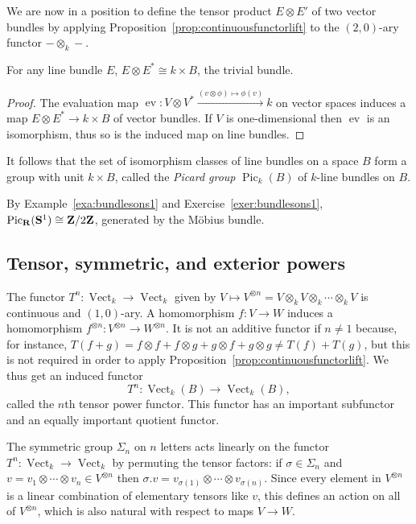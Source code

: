 \documentclass[a4paper,openany]{scrbook}
\DeclareMathOperator{\Vect}{Vect}
\DeclareMathOperator{\Pic}{Pic}
\begin{document}
We are now in a position to define the tensor product $E \otimes E'$ of two vector bundles by applying Proposition~\ref{prop:continuousfunctorlift} to the $(2,0)$-ary functor $- \otimes_k -$.

\begin{lemma}
For any line bundle $E$, $E \otimes E^* \cong k \times B$, the trivial bundle.
\end{lemma}
\begin{proof}
The evaluation map $\operatorname{ev}\colon V \otimes V^* \xrightarrow{(v \otimes \phi) \mapsto \phi(v)} k$ on vector spaces induces a map $E \otimes E^* \to k \times B$ of vector bundles. If $V$ is one-dimensional then $\operatorname{ev}$ is an isomorphism, thus so is the induced map on line bundles.
\end{proof}

It follows that the set of isomorphism classes of line bundles on a space $B$ form a group with unit $k \times B$, called the \emph{Picard group} $\Pic_k(B)$ of $k$-line bundles on $B$.

\begin{example}
By Example~\ref{exa:bundlesons1} and Exercise~\ref{exer:bundlesons1}, $\Pic_{\R}(\S^1) \cong \Z/2\Z$, generated by the Möbius bundle.
\end{example}

\subsection{Tensor, symmetric, and exterior powers}

The functor $T^n\colon \Vect_k \to \Vect_k$ given by $V \mapsto V^{\otimes n} = V \otimes_k V \otimes_k \cdots \otimes_k V$ is continuous and $(1,0)$-ary. A homomorphism $f\colon V \to W$ induces a homomorphism $f^{\otimes n}\colon V^{\otimes n} \to W^{\otimes n}$. It is not an additive functor if $n \neq 1$ because, for instance, $T(f+g) = f \otimes f + f \otimes g + g \otimes f + g \otimes g \neq T(f)+T(g)$, but this is not required in order to apply Proposition~\ref{prop:continuousfunctorlift}. We thus get an induced functor
\[
T^n\colon \Vect_k(B) \to \Vect_k(B),
\]
called the $n$th tensor power functor. This functor has an important subfunctor and an equally important quotient functor.

The symmetric group $\Sigma_n$ on $n$ letters acts linearly on the functor $T^n\colon \Vect_k \to \Vect_k$ by permuting the tensor factors: if $\sigma \in \Sigma_n$ and $v = v_1 \otimes \cdots \otimes v_n \in V^{\otimes n}$ then $\sigma.v = v_{\sigma(1)} \otimes \cdots \otimes v_{\sigma(n)}$. Since every element in $V^{\otimes n}$ is a linear combination of elementary tensors like $v$, this defines an action on all of $V^{\otimes n}$, which is also natural with respect to maps $V \to W$.
\end{document}

